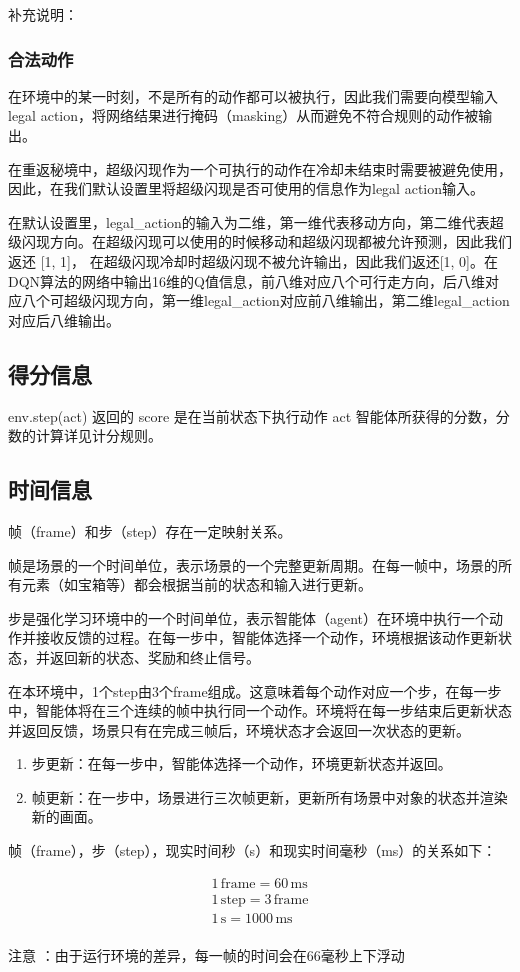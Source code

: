 补充说明：

\subsubsection{合法动作}

在环境中的某一时刻，不是所有的动作都可以被执行，因此我们需要向模型输入legal action，将网络结果进行掩码（masking）从而避免不符合规则的动作被输出。

在重返秘境中，超级闪现作为一个可执行的动作在冷却未结束时需要被避免使用，因此，在我们默认设置里将超级闪现是否可使用的信息作为legal action输入。

在默认设置里，legal\_action的输入为二维，第一维代表移动方向，第二维代表超级闪现方向。在超级闪现可以使用的时候移动和超级闪现都被允许预测，因此我们返还 [1, 1]， 在超级闪现冷却时超级闪现不被允许输出，因此我们返还[1, 0]。在DQN算法的网络中输出16维的Q值信息，前八维对应八个可行走方向，后八维对应八个可超级闪现方向，第一维legal\_action对应前八维输出，第二维legal\_action对应后八维输出。

\subsection{得分信息}

env.step(act) 返回的 score 是在当前状态下执行动作 act 智能体所获得的分数，分数的计算详见计分规则。

\subsection{时间信息}

帧（frame）和步（step）存在一定映射关系。

帧是场景的一个时间单位，表示场景的一个完整更新周期。在每一帧中，场景的所有元素（如宝箱等）都会根据当前的状态和输入进行更新。

步是强化学习环境中的一个时间单位，表示智能体（agent）在环境中执行一个动作并接收反馈的过程。在每一步中，智能体选择一个动作，环境根据该动作更新状态，并返回新的状态、奖励和终止信号。

在本环境中，1个step由3个frame组成。这意味着每个动作对应一个步，在每一步中，智能体将在三个连续的帧中执行同一个动作。环境将在每一步结束后更新状态并返回反馈，场景只有在完成三帧后，环境状态才会返回一次状态的更新。

\begin{enumerate}
\item 步更新：在每一步中，智能体选择一个动作，环境更新状态并返回。
\item 帧更新：在一步中，场景进行三次帧更新，更新所有场景中对象的状态并渲染新的画面。
\end{enumerate}

帧（frame），步（step），现实时间秒（s）和现实时间毫秒（ms）的关系如下：

\begin{align*}
    1\,\text{frame} = 60 \,\text{ms} \\
    1\,\text{step} = 3\,\text{frame} \\
    1\,\text{s} = 1000\,\text{ms} \\
\end{align*}


注意 ：由于运行环境的差异，每一帧的时间会在66毫秒上下浮动

